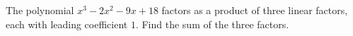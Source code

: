 The polynomial $x^3-2x^2-9x+18$ factors as a product of three linear factors, each with leading coefficient $1$. Find the sum of the three factors.
